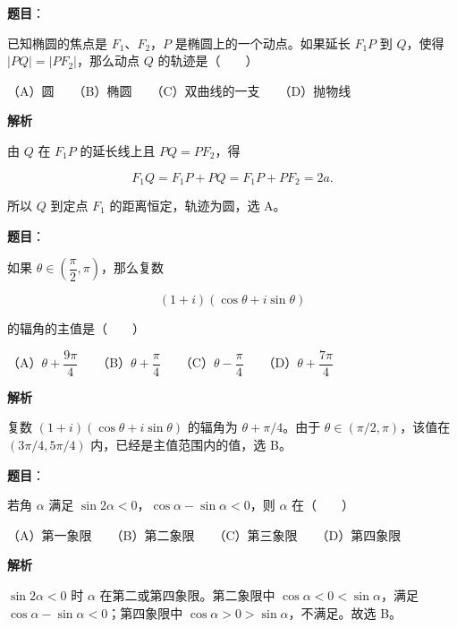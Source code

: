 \begin{answer}

\textbf{题目}：

已知椭圆的焦点是 $F_1\text{、}F_2$，$P$ 是椭圆上的一个动点。如果延长 $F_1P$ 到 $Q$，使得 $|PQ|=|PF_2|$，那么动点 $Q$ 的轨迹是\mbox{（　　）}

（A）圆　　（B）椭圆　　（C）双曲线的一支　　（D）抛物线

\textbf{解析}

由 $Q$ 在 $F_1P$ 的延长线上且 $PQ=PF_2$，得

\nopagebreak[4]
\[
F_1Q=F_1P+PQ=F_1P+PF_2=2a.
\]

所以 $Q$ 到定点 $F_1$ 的距离恒定，轨迹为圆，选 A。


\end{answer}
\begin{answer}

\textbf{题目}：

如果 $\theta\in\left(\dfrac\pi2,\pi\right)$，那么复数

\nopagebreak[4]
\[
(1+i)(\cos\theta+i\sin\theta)
\]

的辐角的主值是\mbox{（　　）}

（A）$\theta+\dfrac{9\pi}{4}$　　（B）$\theta+\dfrac\pi4$　　（C）$\theta-\dfrac\pi4$　　（D）$\theta+\dfrac{7\pi}{4}$

\textbf{解析}

复数 $(1+i)(\cos\theta+i\sin\theta)$ 的辐角为 $\theta+\pi/4$。由于 $\theta\in(\pi/2,\pi)$，该值在 $(3\pi/4,5\pi/4)$ 内，已经是主值范围内的值，选 B。


\end{answer}
\begin{answer}

\textbf{题目}：

若角 $\alpha$ 满足 $\sin2\alpha<0$，$\cos\alpha-\sin\alpha<0$，则 $\alpha$ 在\mbox{（　　）}

（A）第一象限　　（B）第二象限　　（C）第三象限　　（D）第四象限

\textbf{解析}

$\sin2\alpha<0$ 时 $\alpha$ 在第二或第四象限。第二象限中 $\cos\alpha<0<\sin\alpha$，满足 $\cos\alpha-\sin\alpha<0$；第四象限中 $\cos\alpha>0>\sin\alpha$，不满足。故选 B。


\end{answer}
